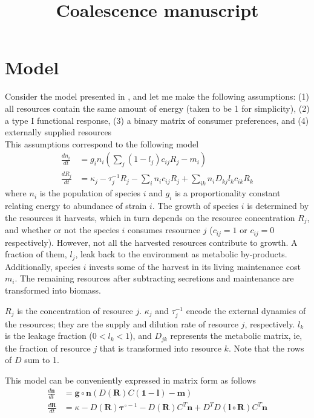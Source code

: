 \documentclass[12pt]{article}
\title{Coalescence manuscript}
\begin{document}
	\maketitle
	\section{Model}
	Consider the model presented in \cite{Marsland2019}, and let me make the following assumptions: (1) all resources contain the same amount of energy (taken to be 1 for simplicity), (2) a type I functional response, (3) a binary matrix of consumer preferences, and (4) externally supplied resources\\
	This assumptions correspond to the following model
	\begin{equation}\label{hybrid}
		\begin{aligned}
		\frac{dn_i}{dt} &= g_in_i\left(\sum_j(1-l_j)c_{ij}R_j - m_i\right)\\
		\frac{dR_{j}}{dt} &= \kappa_j - \tau^{-1}_jR_j - \sum_in_ic_{ij}R_j + \sum_{ik}n_iD_{kj}l_kc_{ik}R_k
		\end{aligned}
	\end{equation}
	where $ n_i $ is the population of species $ i $ and $ g_i $ is a proportionality constant relating energy to abundance of strain $ i $. The growth of species $ i $ is determined by the resources it harvests, which in turn depends on the resource concentration $ R_j $, and whether or not the species $ i $ consumes resournce $ j $ ($ c_{ij} = 1 \text{ or } c_{ij} = 0 $ respectively). However, not all the harvested resources contribute to growth. A fraction of them, $  l_j $, leak back to the environment as metabolic by-products. Additionally, species $ i $ invests some of the harvest in its living maintenance cost $ m_i $. The remaining resources after subtracting secretions and maintenance are transformed into biomass. \par 
	$ R_j $ is the concentration of resource $ j $. $ \kappa_j $ and $ \tau_j^{-1} $ encode the external dynamics of the resources; they are the supply and dilution rate of resource  $ j $, respectively. $ l_k $ is the leakage fraction ($ 0 < l_k < 1 $), and $ D_{jk} $ represents the metabolic matrix, ie, the fraction of resource $ j $ that is transformed into resource $ k $. Note that the rows of $ D $ sum to 1.  \par
	This model can be conveniently expressed in matrix form  as follows
	\begin{equation}
		\begin{aligned}
		\frac{d\boldsymbol{n}}{dt} &= \boldsymbol{g}\circ \boldsymbol{n}\left(D(\boldsymbol{R})C(\boldsymbol{1}-\boldsymbol{l}) - \boldsymbol{m}\right)\\
		\frac{d\boldsymbol{R}}{dt} &= \kappa - D(\boldsymbol{R})\boldsymbol{\tau}^{\circ -1}- D(\boldsymbol{R})C^T\boldsymbol{n} + D^TD(\boldsymbol{l}\circ \boldsymbol{R})C^T\boldsymbol{n}
		\end{aligned}
	\end{equation}
\end{document}
